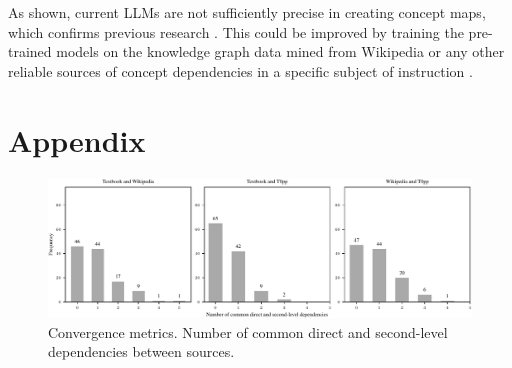 \documentclass{article}
\begin{document}




As shown, current LLMs are not sufficiently precise in creating concept maps, which confirms previous research \cite{hwang2021comet}. This could be improved by training the pre-trained models on the knowledge graph data mined from Wikipedia or any other reliable sources of concept dependencies in a specific subject of instruction \cite{west2022symbolic}.




\newpage


\section{Appendix}



\begin{figure}[H]
    \centering
    \includegraphics[width=.95\textwidth]{img/comp_second_deps.pdf}
    \caption{Convergence metrics. Number of common direct and second-level dependencies between sources.}
    \label{fig:comp_second_deps}
\end{figure}
\end{document}
